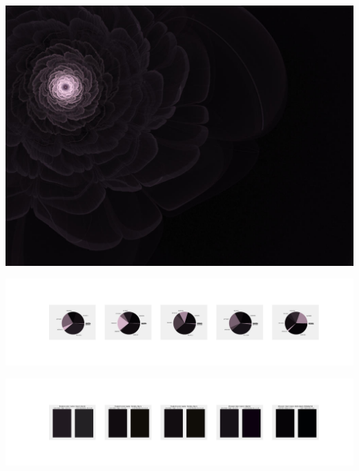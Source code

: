 \documentclass[11pt]{article}
\begin{document}
\begin{landscape}
    \begin{center}
    \includegraphics[width=\textwidth]{./nbimg/file (265).jpg}
    \end{center}

    \begin{center}
    \includegraphics[width=250mm]{./nbimg/pie-184.jpg}
    \end{center}

    \begin{center}
    \includegraphics[width=250mm]{./nbimg/peak-184.jpg}
    \end{center}
    


\end{landscape}
\end{document}
